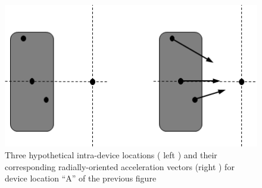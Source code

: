 \documentclass[prb,preprint]{revtex4-1}
\begin{document}
\begin{figure} [h]
\includegraphics[width=14 cm]{NotAtCenter}
\centering
\caption{Three hypothetical intra-device locations ( left ) and their corresponding radially-oriented acceleration vectors (right ) for device location “A” of the previous figure }
\label{fig:NotAtCenter}
\end{figure}
\end{document}
